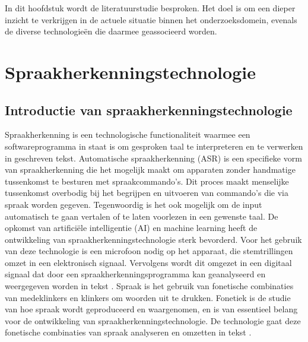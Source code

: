 
In dit hoofdstuk wordt de literatuurstudie besproken. Het doel is om een dieper inzicht te verkrijgen in de actuele situatie binnen het onderzoeksdomein, evenals de diverse technologieën die daarmee geassocieerd worden.

\section{Spraakherkenningstechnologie}
\subsection{Introductie van spraakherkenningstechnologie}
Spraakherkenning is een technologische functionaliteit waarmee een softwareprogramma in staat is om gesproken taal te interpreteren en te verwerken in geschreven tekst. \autocite{Anusuya2009} Automatische spraakherkenning (ASR) is een specifieke vorm van spraakherkenning die het mogelijk maakt om apparaten zonder handmatige tussenkomst te besturen met spraakcommando's. Dit proces maakt menselijke tussenkomst overbodig bij het begrijpen en uitvoeren van commando's die via spraak worden gegeven. Tegenwoordig is het ook mogelijk om de input automatisch te gaan vertalen of te laten voorlezen in een gewenste taal. De opkomst van artificiële intelligentie (AI) en machine learning heeft de ontwikkeling van spraakherkenningstechnologie sterk bevorderd. Voor het gebruik van deze technologie is een microfoon nodig op het apparaat, die stemtrillingen omzet in een elektronisch signaal. Vervolgens wordt dit omgezet in een digitaal signaal dat door een spraakherkenningsprogramma kan geanalyseerd en weergegeven worden in tekst \autocite{Zwass2022}. Spraak is het gebruik van fonetische combinaties van medeklinkers en klinkers om woorden uit te drukken. Fonetiek is de studie van hoe spraak wordt geproduceerd en waargenomen, en is van essentieel belang voor de ontwikkeling van spraakherkenningstechnologie. De technologie gaat deze fonetische combinaties van spraak analyseren en omzetten in tekst \autocite{Mehrish2023}.


